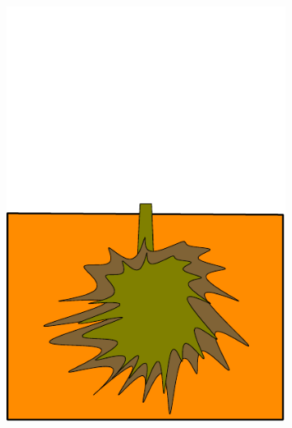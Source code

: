\documentclass[10pt]{article}
\begin{document}
\begin{figure}[!ht]
\begin{subfigure}[b]{.1125\linewidth}
\includegraphics[width=1.0\linewidth]{img/tree_pics_5}
\caption{}  %
\label{fig:grow_5}
\end{subfigure}
\begin{subfigure}[b]{.1125\linewidth}
\centering

\end{subfigure}
\end{figure}
\end{document}
